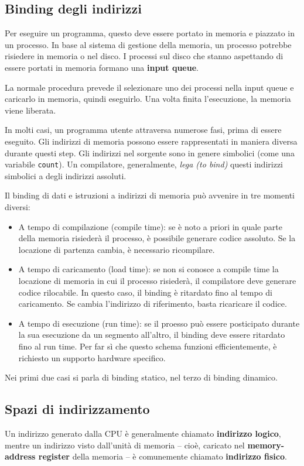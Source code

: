 \documentclass[a4paper]{article}
\begin{document}
\subsection{Binding degli indirizzi}
Per eseguire un programma, questo deve essere portato in memoria e piazzato in un processo. In base al sistema di gestione della memoria, un processo potrebbe risiedere in memoria o nel disco. I processi sul disco che stanno aspettando di essere portati in memoria formano una \textbf{input queue}.

La normale procedura prevede il selezionare uno dei processi nella input queue e caricarlo in memoria, quindi eseguirlo. Una volta finita l'esecuzione, la memoria viene liberata.

In molti casi, un programma utente attraversa numerose fasi, prima di essere eseguito. Gli indirizzi di memoria possono essere rappresentati in maniera diversa durante questi step. \newline
Gli indirizzi nel sorgente sono in genere simbolici (come una variabile \texttt{count}). Un compilatore, generalmente, \textit{lega (to bind)} questi indirizzi simbolici a degli indirizzi assoluti.

Il binding di dati e istruzioni a indirizzi di memoria può avvenire in tre momenti diversi:
\begin{itemize}
   \item A tempo di compilazione (compile time): se è noto a priori in quale parte della memoria risiederà il processo, è possibile generare codice assoluto. Se la locazione di partenza cambia, è necessario ricompilare.
   \item A tempo di caricamento (load time): se non si conosce a compile time la locazione di memoria in cui il processo risiederà, il compilatore deve generare codice rilocabile. In questo caso, il binding è ritardato fino al tempo di caricamento. Se cambia l'indirizzo di riferimento, basta ricaricare il codice.
   \item A tempo di esecuzione (run time): se il proesso può essere posticipato durante la sua esecuzione da un segmento all'altro, il binding deve essere ritardato fino al run time. Per far sì che questo schema funzioni efficientemente, è richiesto un supporto hardware specifico.
\end{itemize}
Nei primi due casi si parla di binding statico, nel terzo di binding dinamico.

\subsection{Spazi di indirizzamento}
Un indirizzo generato dalla CPU è generalmente chiamato \textbf{indirizzo logico}, mentre un indirizzo visto dall'unità di memoria -- cioè, caricato nel \textbf{memory-address register} della memoria -- è comunemente chiamato \textbf{indirizzo fisico}.
\end{document}

